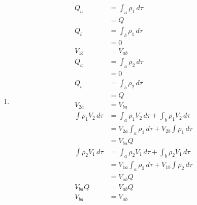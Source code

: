 \documentclass{article}
\begin{document}
\begin{enumerate}
  \item

        \begin{align*}
          Q_a                      & = \int_a \rho_1 \,d \tau                                        \\
                                   & = Q                                                             \\
          Q_b                      & = \int_b \rho_1 \,d \tau                                        \\
                                   & = 0                                                             \\
          V_{1 b}                  & = V_{a b}                                                       \\
          Q_a                      & = \int_a \rho_2 \,d \tau                                        \\
                                   & = 0                                                             \\
          Q_b                      & = \int_b \rho_2 \,d \tau                                        \\
                                   & = Q                                                             \\
          V_{2 a}                  & = V_{b a}                                                       \\
          \int \rho_1 V_2 \,d \tau & = \int_a \rho_1 V_2 \,d \tau + \int_b \rho_1 V_2 \,d \tau       \\
                                   & = V_{2 a} \int_a \rho_1 \,d \tau + V_{2 b} \int \rho_1 \,d \tau \\
                                   & = V_{b a} Q                                                     \\
          \int \rho_2 V_1 \,d \tau & = \int_a \rho_2 V_1 \,d \tau + \int_b \rho_2 V_1 \,d \tau       \\
                                   & = V_{1 a} \int_a \rho_2 \,d \tau + V_{1 b} \int \rho_2 \,d \tau \\
                                   & = V_{a b} Q                                                     \\
          V_{b a} Q                & = V_{a b} Q                                                     \\
          V_{b a}                  & = V_{a b}
        \end{align*}
\end{enumerate}
\end{document}
